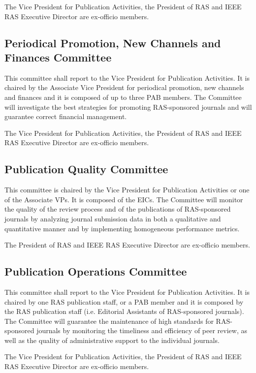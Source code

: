\documentclass[10pt]{article}
\begin{document}
The Vice President for Publication Activities, the President of RAS and IEEE RAS Executive Director are ex-officio members.


\subsection{Periodical Promotion, New Channels and Finances Committee}

This committee shall report to the Vice President for Publication Activities. It is chaired by the Associate Vice President for periodical promotion, new channels and finances and it is composed of up to three PAB members. The Committee will investigate the best strategies for promoting RAS-sponsored journals and will guarantee correct financial management.

The Vice President for Publication Activities, the President of RAS and IEEE RAS Executive Director are ex-officio members.


\subsection{Publication Quality Committee}

This committee is chaired by the Vice President for Publication Activities or one of the Associate VPs. It is composed of the EICs. The Committee will monitor the quality of the review process and of the publications of RAS-sponsored journals by analyzing journal submission data in both a qualitative and quantitative manner and by implementing homogeneous performance metrics.

The President of RAS and IEEE RAS Executive Director are ex-officio members.



\subsection{Publication Operations Committee}

This committee shall report to the Vice President for Publication Activities. It is chaired by one RAS publication staff, or a PAB member and it is composed by the RAS publication staff (i.e. Editorial Assistants of RAS-sponsored journals). The Committee will guarantee the maintenance of high standards for RAS-sponsored journals by monitoring the timeliness and efficiency of peer review, as well as the quality of administrative support to the individual journals.

The Vice President for Publication Activities, the President of RAS and IEEE RAS Executive Director are ex-officio members.
\end{document}
